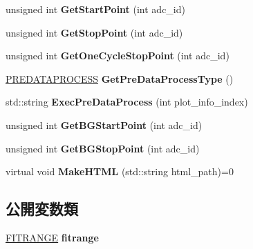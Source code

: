\begin{DoxyCompactItemize}
unsigned int {\bfseries Get\+Start\+Point} (int adc\+\_\+id)
\item 
\mbox{\label{class_t_k_a_n_a_l_y_z_e_a561d27047b90eb3a344a1c86f5290605}} 
unsigned int {\bfseries Get\+Stop\+Point} (int adc\+\_\+id)
\item 
\mbox{\label{class_t_k_a_n_a_l_y_z_e_a607144cda4f6ad2cf472ee792c0aa8a7}} 
unsigned int {\bfseries Get\+One\+Cycle\+Stop\+Point} (int adc\+\_\+id)
\item 
\mbox{\label{class_t_k_a_n_a_l_y_z_e_ab1ff5012692d965c4a271c1c07f6488a}} 
\hyperlink{class_t_k_a_n_a_l_y_z_e_a7a931f59627879ac86be378797e00e1e}{P\+R\+E\+D\+A\+T\+A\+P\+R\+O\+C\+E\+SS} {\bfseries Get\+Pre\+Data\+Process\+Type} ()
\item 
\mbox{\label{class_t_k_a_n_a_l_y_z_e_a5be002cc215145a2af05c85cf50aabe7}} 
std\+::string {\bfseries Exec\+Pre\+Data\+Process} (int plot\+\_\+info\+\_\+index)
\item 
\mbox{\label{class_t_k_a_n_a_l_y_z_e_aace6823fed1a7c8807379814f0e39479}} 
unsigned int {\bfseries Get\+B\+G\+Start\+Point} (int adc\+\_\+id)
\item 
\mbox{\label{class_t_k_a_n_a_l_y_z_e_a33a9cddb9934bce702e9e0401a580428}} 
unsigned int {\bfseries Get\+B\+G\+Stop\+Point} (int adc\+\_\+id)
\item 
\mbox{\label{class_t_k_a_n_a_l_y_z_e_ac733b5115d5fbc77d1194880cf97172d}} 
virtual void {\bfseries Make\+H\+T\+ML} (std\+::string html\+\_\+path)=0
\end{DoxyCompactItemize}
\subsection*{公開変数類}
\begin{DoxyCompactItemize}
\item 
\mbox{\label{class_t_k_a_n_a_l_y_z_e_a55e1a2c600ba6fb90f849f04e3dffc0d}} 
\hyperlink{class_t_k_a_n_a_l_y_z_e_1_1_f_i_t_r_a_n_g_e}{F\+I\+T\+R\+A\+N\+GE} {\bfseries fitrange}
\end{DoxyCompactItemize}
